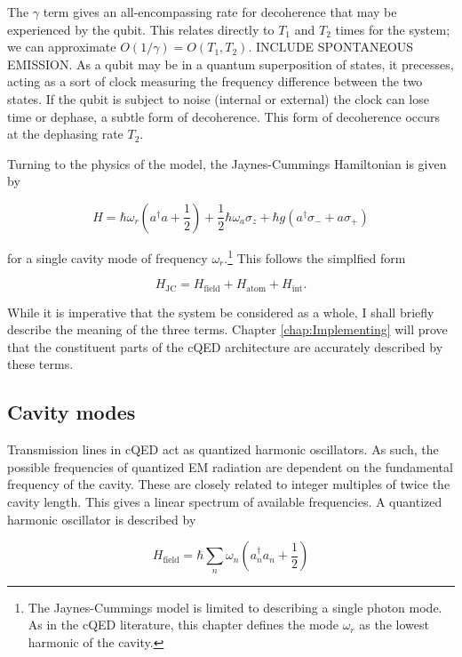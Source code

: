 \documentclass[11 pt, oneside]{book} %
\begin{document}
The $\gamma$ term gives an all-encompassing rate for decoherence that may be experienced by the qubit. This relates directly to $T_1$ and $T_2$ times for the system; we can approximate $O(1/\gamma)= O(T_1,T_2)$. INCLUDE SPONTANEOUS EMISSION. As a qubit may be in a quantum superposition of states, it precesses, acting as a sort of clock measuring the frequency difference between the two states. If the qubit is subject to noise (internal or external) the clock can lose time or dephase, a subtle form of decoherence.\cite{Schuster} This form of decoherence occurs at the dephasing rate $T_2$.

Turning to the physics of the model, the Jaynes-Cummings Hamiltonian is given by

\begin{equation}\label{eq:JC}
H=\hbar \omega_r(a^\dag a + \frac{1}{2}) + \frac{1}{2}\hbar \omega_a \sigma_z + \hbar g(a^\dag \sigma_- + a\sigma_+)
\end{equation}

for a single cavity mode of frequency $\omega_r$.\footnote{The Jaynes-Cummings model is limited to describing a single photon mode. As in the cQED literature, this chapter defines the mode $\omega_r$ as the lowest harmonic of the cavity. } This follows the simplfied form

\begin{equation}
H_{\mathrm{JC}} = H_{\mathrm{field}}+H_{\mathrm{atom}}+H_{\mathrm{int}}.
\end{equation}

While it is imperative that the system be considered as a whole, I shall briefly describe the meaning of the three terms. Chapter \ref{chap:Implementing} will prove that the constituent parts of the cQED architecture are accurately described by these terms. 

\subsection{Cavity modes}
Transmission lines in cQED act as quantized harmonic oscillators. As such, the possible frequencies of quantized EM radiation are dependent on the fundamental frequency of the cavity. These are closely related to integer multiples of twice the cavity length. This gives a linear spectrum of available frequencies. A quantized harmonic oscillator is described by 

\begin{equation}\label{eq:CavityHamiltonian}
H_{\mathrm{field}}=\hbar \sum_n\omega_n(a_n^\dag a_n+\frac{1}{2})
\end{equation}
\end{document}
